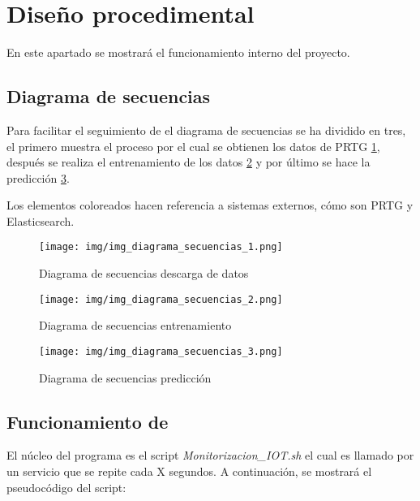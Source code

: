 \newpage

\section{Diseño procedimental}
En este apartado se mostrará el funcionamiento interno del proyecto.

\subsection{Diagrama de secuencias}
Para facilitar el seguimiento de el diagrama de secuencias se ha dividido en tres, el primero muestra el proceso por el cual se obtienen los datos de PRTG \ref{img_diagrama_secuencias 1}, después se realiza el entrenamiento de los datos \ref{img_diagrama_secuencias 2} y por último se hace la predicción \ref{img_diagrama_secuencias 3}.

Los elementos coloreados hacen referencia a sistemas externos, cómo son PRTG y Elasticsearch.

\begin{figure}[!h]
	\centering
	\texttt{[image: img/img\_diagrama\_secuencias\_1.png]}
	\caption{Diagrama de secuencias descarga de datos}
	\label{img_diagrama_secuencias 1}
\end{figure}

\begin{figure}[!h]
	\centering
	\texttt{[image: img/img\_diagrama\_secuencias\_2.png]}
	\caption{Diagrama de secuencias entrenamiento}
	\label{img_diagrama_secuencias 2}
\end{figure}

\begin{figure}[!h]
	\centering
	\texttt{[image: img/img\_diagrama\_secuencias\_3.png]}
	\caption{Diagrama de secuencias predicción}
	\label{img_diagrama_secuencias 3}
\end{figure}
\newpage



\clearpage
\subsection{Funcionamiento de \nombrePrograma}

El núcleo del programa es el script \textit{Monitorizacion\_IOT.sh} el cual es llamado por un servicio que se repite cada X segundos. A continuación, se mostrará el pseudocódigo del script:

